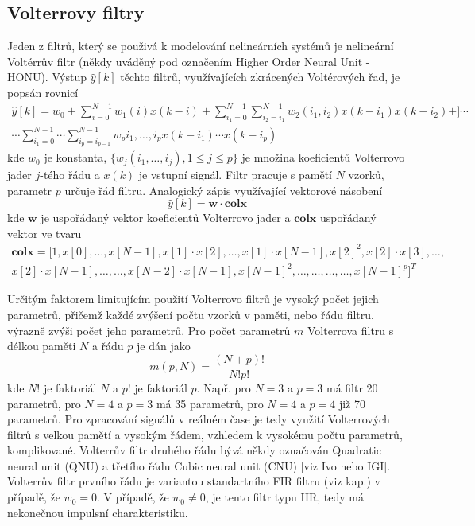 \subsection{Volterrovy filtry}\label{chap:volterra}
Jeden z filtrů, který se použivá k modelování nelineárních systémů je nelineární Voltérrův filtr (někdy uváděný pod označením Higher Order Neural Unit - HONU). Výstup $\hat{y}[k]$ těchto filtrů, využívajících zkrácených Voltérových řad, je popsán rovnicí 
\begin{multline}
    \hat{y}[k]=w_0+\sum_{i=0}^{N-1}w_1(i)x(k-i) +  \sum_{i_1=0}^{N-1}\sum_{i_2=i_1}^{N-1}w_2(i_1,i_2)x(k-i_1)x(k-i_2)+] \cdots \\\cdots  \sum_{i_1=0}^{N-1} \cdots \sum_{i_p=i_{p-1}}^{N-1}w_p{i_1,\dots,i_p}x(k-i_1)\cdots x(k-i_p)
\end{multline}
kde $w_0$ je konstanta, $\{w_j(i_1,\dots,i_j), 1 \leq j \leq p\}$ je množina koeficientů Volterrovo jader $j$-tého řádu a $x(k)$ je vstupní signál. Filtr pracuje s pamětí $N$ vzorků, parametr $p$ určuje řád filtru. Analogický zápis využívající vektorové násobení
\begin{equation}
    \hat{y}[k]= \textbf{w} \cdot \textbf{colx}
\end{equation}
kde $\textbf{w}$ je uspořádaný vektor koeficientů Volterrovo jader a $\textbf{colx}$ uspořádaný vektor ve tvaru
\begin{multline}
    \textbf{colx}=[1,x[0],\dots,x[N-1],x[1] \cdot x[2], \dots, x[1]\cdot x[N-1],x[2]^2,x[2]\cdot x[3], \dots,\\ x[2] \cdot x[N-1],\dots, \dots,x[N-2]\cdot x[N-1], x[N-1]^2,\dots, \dots, \dots, \dots, x[N-1]^p]^T 
\end{multline}

Určitým faktorem limitujícím použití Volterrovo filtrů je vysoký počet jejich parametrů, přičemž každé zvýšení počtu vzorků v paměti, nebo řádu filtru, výrazně zvýši počet jeho parametrů. Pro počet parametrů $m$ Volterrova filtru s délkou paměti $N$ a řádu $p$ je dán jako
\begin{equation}
    m(p,N)=\frac{(N+p)!}{N!p!}
\end{equation}
kde $N!$ je faktoriál $N$ a $p!$ je faktoriál $p$. Např. pro $N=3$ a $p=3$ má filtr 20 parametrů, pro $N=4$ a $p=3$ má 35 parametrů, pro  $N=4$ a $p=4$ již 70 parametrů. Pro zpracování signálů v reálném čase je tedy využití  Volterrových filtrů s velkou pamětí a vysokým řádem, vzhledem k vysokému počtu parametrů, komplikované. Volterrův filtr druhého řádu bývá někdy označován Quadratic neural unit (QNU) a třetího řádu Cubic neural unit (CNU) [viz Ivo nebo IGI]. Volterrův filtr prvního řádu je variantou standartního FIR filtru (viz kap.) v případě, že $w_0=0$. V případě, že $w_0\neq 0$, je tento filtr typu IIR, tedy má nekonečnou impulsní charakteristiku.

